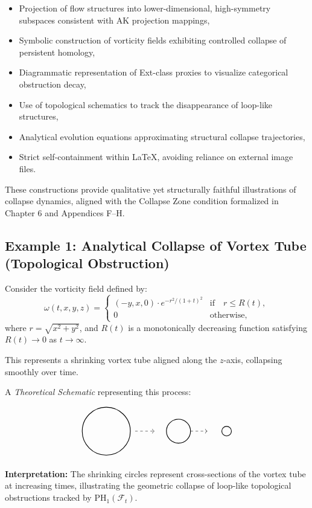 \documentclass[11pt]{article}
\begin{document}
\begin{itemize}
  \item Projection of flow structures into lower-dimensional, high-symmetry subspaces consistent with AK projection mappings,
  \item Symbolic construction of vorticity fields exhibiting controlled collapse of persistent homology,
  \item Diagrammatic representation of Ext-class proxies to visualize categorical obstruction decay,
  \item Use of topological schematics to track the disappearance of loop-like structures,
  \item Analytical evolution equations approximating structural collapse trajectories,
  \item Strict self-containment within LaTeX, avoiding reliance on external image files.
\end{itemize}

These constructions provide qualitative yet structurally faithful illustrations of collapse dynamics, aligned with the Collapse Zone condition formalized in Chapter 6 and Appendices F–H.

\subsection{Example 1: Analytical Collapse of Vortex Tube (Topological Obstruction)}

Consider the vorticity field defined by:
\[
\omega(t, x, y, z) =
\begin{cases}
(-y, x, 0) \cdot e^{-r^2/(1 + t)^2} & \text{if} \quad r \leq R(t), \\
0 & \text{otherwise},
\end{cases}
\]
where \( r = \sqrt{x^2 + y^2} \), and \( R(t) \) is a monotonically decreasing function satisfying \( R(t) \to 0 \) as \( t \to \infty \).

This represents a shrinking vortex tube aligned along the \( z \)-axis, collapsing smoothly over time.

A \emph{Theoretical Schematic} representing this process:

\[
\begin{tikzpicture}
\draw[thick] (0,0) circle (1);
\draw[dashed,->] (1.2,0) -- (2,0);
\draw[thick] (3,0) circle (0.5);
\draw[dashed,->] (3.5,0) -- (4.2,0);
\draw[thick] (5,0) circle (0.2);
\end{tikzpicture}
\]

\textbf{Interpretation:}  
The shrinking circles represent cross-sections of the vortex tube at increasing times, illustrating the geometric collapse of loop-like topological obstructions tracked by \( \mathrm{PH}_1(\mathcal{F}_t) \).
\end{document}

